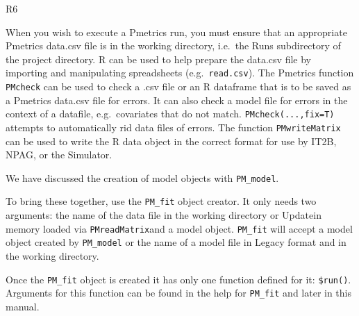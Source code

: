 \documentclass[
]{book}
\newenvironment{Shaded}{\begin{snugshade}}{\end{snugshade}}
\newcommand{\AttributeTok}[1]{\textcolor[rgb]{0.77,0.63,0.00}{#1}}
\newcommand{\CommentTok}[1]{\textcolor[rgb]{0.56,0.35,0.01}{\textit{#1}}}
\newcommand{\FunctionTok}[1]{\textcolor[rgb]{0.00,0.00,0.00}{#1}}
\newcommand{\NormalTok}[1]{#1}
\newcommand{\OtherTok}[1]{\textcolor[rgb]{0.56,0.35,0.01}{#1}}
\newcommand{\SpecialCharTok}[1]{\textcolor[rgb]{0.00,0.00,0.00}{#1}}
\newcommand{\StringTok}[1]{\textcolor[rgb]{0.31,0.60,0.02}{#1}}
\begin{document}
{R6}

When you wish to execute a Pmetrics run, you must ensure that an
appropriate Pmetrics data.csv file is in the working
directory, i.e.~the Runs subdirectory of the project directory. R can be
used to help prepare the data.csv file by importing and manipulating
spreadsheets (e.g.~\texttt{read.csv}). The Pmetrics function \texttt{PMcheck} can be
used to check a .csv file or an R dataframe that is to be saved as a
Pmetrics data.csv file for errors. It can also check a model file for
errors in the context of a datafile, e.g.~covariates that do not match.
\texttt{PMcheck(...,fix=T)} attempts to automatically rid data files of errors.
The function \texttt{PMwriteMatrix} can be used to write the R data object in
the correct format for use by IT2B, NPAG, or the Simulator.

We have discussed the creation of model objects with \texttt{PM\_model}.

To bring these together, use the \texttt{PM\_fit} object creator. It only needs two arguments: the name of the data file in the working directory or
{Update}in memory loaded via \texttt{PMreadMatrix}and a model object. \texttt{PM\_fit} will accept a model object created by \texttt{PM\_model} or the name of a model file in Legacy format and in the working directory.

\begin{Shaded}
\end{Shaded}

Once the \texttt{PM\_fit} object is created it has only one function defined for it: \texttt{\$run()}. Arguments for this function can be found in the help for \texttt{PM\_fit} and later in this manual.
\end{document}
